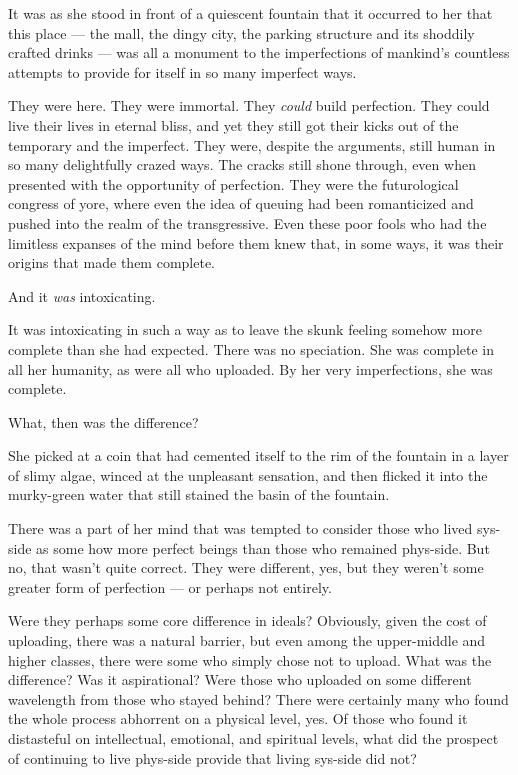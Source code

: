 It was as she stood in front of a quiescent fountain that it occurred to her that this place — the mall, the dingy city, the parking structure and its shoddily crafted drinks — was all a monument to the imperfections of mankind's countless attempts to provide for itself in so many imperfect ways.

They were here. They were immortal. They \emph{could} build perfection. They could live their lives in eternal bliss, and yet they still got their kicks out of the temporary and the imperfect. They were, despite the arguments, still human in so many delightfully crazed ways. The cracks still shone through, even when presented with the opportunity of perfection. They were the futurological congress of yore, where even the idea of queuing had been romanticized and pushed into the realm of the transgressive. Even these poor fools who had the limitless expanses of the mind before them knew that, in some ways, it was their origins that made them complete.

And it \emph{was} intoxicating.

It was intoxicating in such a way as to leave the skunk feeling somehow more complete than she had expected. There was no speciation. She was complete in all her humanity, as were all who uploaded. By her very imperfections, she was complete.

What, then was the difference?

She picked at a coin that had cemented itself to the rim of the fountain in a layer of slimy algae, winced at the unpleasant sensation, and then flicked it into the murky-green water that still stained the basin of the fountain.

There was a part of her mind that was tempted to consider those who lived sys-side as some how more perfect beings than those who remained phys-side. But no, that wasn't quite correct. They were different, yes, but they weren't some greater form of perfection — or perhaps not entirely.

Were they perhaps some core difference in ideals? Obviously, given the cost of uploading, there was a natural barrier, but even among the upper-middle and higher classes, there were some who simply chose not to upload. What was the difference? Was it aspirational? Were those who uploaded on some different wavelength from those who stayed behind? There were certainly many who found the whole process abhorrent on a physical level, yes. Of those who found it distasteful on intellectual, emotional, and spiritual levels, what did the prospect of continuing to live phys-side provide that living sys-side did not?

